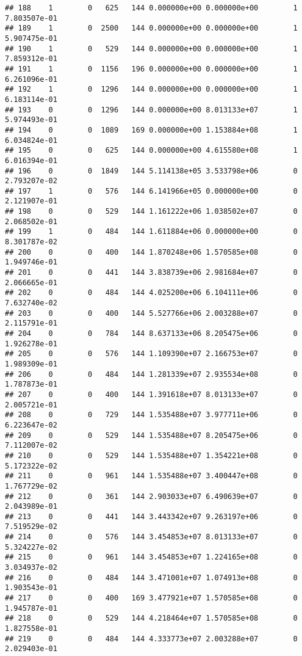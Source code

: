 \documentclass[
]{article}
\begin{document}
\begin{enumerate}
\begin{verbatim}
## 188    1        0   625   144 0.000000e+00 0.000000e+00        1  7.803507e-01
## 189    1        0  2500   144 0.000000e+00 0.000000e+00        1  5.907475e-01
## 190    1        0   529   144 0.000000e+00 0.000000e+00        1  7.859312e-01
## 191    1        0  1156   196 0.000000e+00 0.000000e+00        1  6.261096e-01
## 192    1        0  1296   144 0.000000e+00 0.000000e+00        1  6.183114e-01
## 193    0        0  1296   144 0.000000e+00 8.013133e+07        1  5.974493e-01
## 194    0        0  1089   169 0.000000e+00 1.153884e+08        1  6.034824e-01
## 195    0        0   625   144 0.000000e+00 4.615580e+08        1  6.016394e-01
## 196    0        0  1849   144 5.114138e+05 3.533798e+06        0  2.793207e-02
## 197    1        0   576   144 6.141966e+05 0.000000e+00        0  2.121907e-01
## 198    0        0   529   144 1.161222e+06 1.038502e+07        0  2.068502e-01
## 199    1        0   484   144 1.611884e+06 0.000000e+00        0  8.301787e-02
## 200    0        0   400   144 1.870248e+06 1.570585e+08        0  1.949746e-01
## 201    0        0   441   144 3.838739e+06 2.981684e+07        0  2.066665e-01
## 202    0        0   484   144 4.025200e+06 6.104111e+06        0  7.632740e-02
## 203    0        0   400   144 5.527766e+06 2.003288e+07        0  2.115791e-01
## 204    0        0   784   144 8.637133e+06 8.205475e+06        0  1.926278e-01
## 205    0        0   576   144 1.109390e+07 2.166753e+07        0  1.989309e-01
## 206    0        0   484   144 1.281339e+07 2.935534e+08        0  1.787873e-01
## 207    0        0   400   144 1.391618e+07 8.013133e+07        0  2.005721e-01
## 208    0        0   729   144 1.535488e+07 3.977711e+06        0  6.223647e-02
## 209    0        0   529   144 1.535488e+07 8.205475e+06        0  7.112007e-02
## 210    0        0   529   144 1.535488e+07 1.354221e+08        0  5.172322e-02
## 211    0        0   961   144 1.535488e+07 3.400447e+08        0  1.767729e-02
## 212    0        0   361   144 2.903033e+07 6.490639e+07        0  2.043989e-01
## 213    0        0   441   144 3.443342e+07 9.263197e+06        0  7.519529e-02
## 214    0        0   576   144 3.454853e+07 8.013133e+07        0  5.324227e-02
## 215    0        0   961   144 3.454853e+07 1.224165e+08        0  3.034937e-02
## 216    0        0   484   144 3.471001e+07 1.074913e+08        0  1.903543e-01
## 217    0        0   400   169 3.477921e+07 1.570585e+08        0  1.945787e-01
## 218    0        0   529   144 4.218464e+07 1.570585e+08        0  1.827558e-01
## 219    0        0   484   144 4.333773e+07 2.003288e+07        0  2.029403e-01

\end{verbatim}
\end{enumerate}
\end{document}
